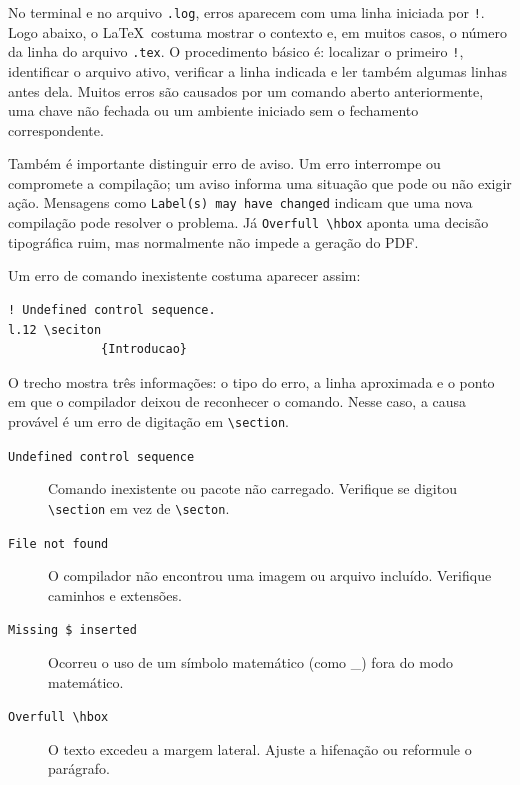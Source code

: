 No terminal e no arquivo \texttt{.log}, erros aparecem com uma linha iniciada por \texttt{!}. Logo abaixo, o \LaTeX\ costuma mostrar o contexto e, em muitos casos, o número da linha do arquivo \texttt{.tex}. O procedimento básico é: localizar o primeiro \texttt{!}, identificar o arquivo ativo, verificar a linha indicada e ler também algumas linhas antes dela. Muitos erros são causados por um comando aberto anteriormente, uma chave não fechada ou um ambiente iniciado sem o fechamento correspondente.

Também é importante distinguir erro de aviso. Um erro interrompe ou compromete a compilação; um aviso informa uma situação que pode ou não exigir ação. Mensagens como \texttt{Label(s) may have changed} indicam que uma nova compilação pode resolver o problema. Já \texttt{Overfull \textbackslash hbox} aponta uma decisão tipográfica ruim, mas normalmente não impede a geração do PDF.

Um erro de comando inexistente costuma aparecer assim:

\begin{lstlisting}[caption={Exemplo de erro no log}]
! Undefined control sequence.
l.12 \seciton
             {Introducao}
\end{lstlisting}

O trecho mostra três informações: o tipo do erro, a linha aproximada e o ponto em que o compilador deixou de reconhecer o comando. Nesse caso, a causa provável é um erro de digitação em \verb|\section|.

\begin{description}
    \item[\texttt{Undefined control sequence}] Comando inexistente ou pacote não carregado. Verifique se digitou \verb|\section| em vez de \verb|\secton|.
    \item[\texttt{File not found}] O compilador não encontrou uma imagem ou arquivo incluído. Verifique caminhos e extensões.
    \item[\texttt{Missing \$ inserted}] Ocorreu o uso de um símbolo matemático (como \_) fora do modo matemático.
    \item[\texttt{Overfull \textbackslash hbox}] O texto excedeu a margem lateral. Ajuste a hifenação ou reformule o parágrafo.
\end{description}

